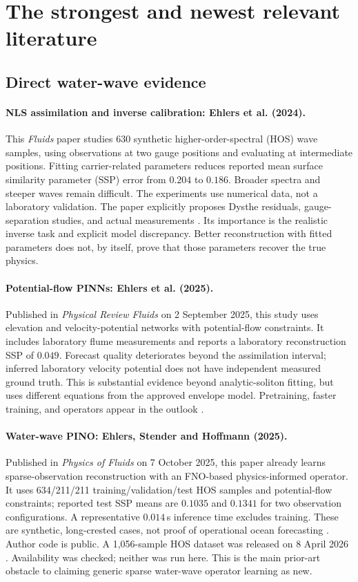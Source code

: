\section{The strongest and newest relevant literature}
\label{sec:literature}
\subsection{Direct water-wave evidence}
\paragraph{NLS assimilation and inverse calibration: Ehlers et al. (2024).}
This \emph{Fluids} paper studies 630 synthetic higher-order-spectral (HOS)
wave samples, using observations at two gauge positions and evaluating at
intermediate positions. Fitting carrier-related parameters reduces reported
mean surface similarity parameter (SSP) error from $0.204$ to $0.186$.
Broader spectra and steeper waves remain difficult. The experiments use
numerical data, not a laboratory validation. The paper explicitly proposes
Dysthe residuals, gauge-separation studies, and actual measurements
\cite{ehlers2024}. Its importance is the realistic inverse task and explicit
model discrepancy. Better reconstruction with fitted parameters does not,
by itself, prove that those parameters recover the true physics.

\paragraph{Potential-flow PINNs: Ehlers et al. (2025).}
Published in \emph{Physical Review Fluids} on 2 September 2025, this study
uses elevation and velocity-potential networks with potential-flow
constraints. It includes laboratory flume measurements and reports a
laboratory reconstruction SSP of $0.049$. Forecast quality deteriorates
beyond the assimilation interval; inferred laboratory velocity potential
does not have independent measured ground truth. This is substantial
evidence beyond analytic-soliton fitting, but uses different equations from
the approved envelope model. Pretraining, faster training, and operators
appear in the outlook \cite{ehlers2025}.

\paragraph{Water-wave PINO: Ehlers, Stender and Hoffmann (2025).}
Published in \emph{Physics of Fluids} on 7 October 2025, this paper already
learns sparse-observation reconstruction with an FNO-based physics-informed
operator. It uses 634/211/211 training/validation/test HOS samples and
potential-flow constraints; reported test SSP means are $0.1035$ and
$0.1341$ for two observation configurations. A representative $0.014$\,s
inference time excludes training. These are synthetic, long-crested cases,
not proof of operational ocean forecasting \cite{wavepino}.
Author code is public. A 1,056-sample HOS dataset was released on
8 April 2026 \cite{hosdata}. Availability was checked; neither was run here.
This is the main prior-art obstacle to claiming generic sparse water-wave
operator learning as new.

